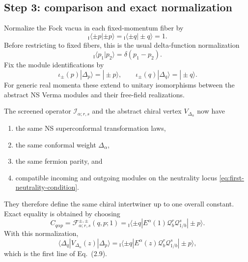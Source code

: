 \documentclass[11pt]{article}
\newcommand{\Ibra}[1]{{}_{\mathsf I}\!\langle #1|}
\begin{document}
\subsection{Step 3: comparison and exact normalization}

Normalize the Fock vacua in each fixed-momentum fiber by
\begin{equation}
 \Ibra{\pm p}\pm p\rangle
 =
 \Ibra{\pm q}\pm q\rangle
 =1.
 \label{eq:Fock-vacuum-normalization}
\end{equation}
Before restricting to fixed fibers, this is the usual delta-function
normalization
\begin{equation}
 \Ibra{p_1}p_2\rangle=\delta(p_1-p_2).
 \label{eq:delta-function-normalization}
\end{equation}
Fix the module identifications by
\begin{equation}
 \iota_\pm(p)|\Delta_p\rangle=|\pm p\rangle,
 \qquad
 \iota_\pm(q)|\Delta_q\rangle=|\pm q\rangle.
 \label{eq:normalized-module-identifications}
\end{equation}
For generic real momenta these extend to unitary isomorphisms between the
abstract NS Verma modules and their free-field realizations.

The screened operator \(\mathcal I_{\alpha;r,s}\) and the abstract chiral
vertex \(V_{\Delta_\alpha}\) now have
\begin{enumerate}
 \item the same NS superconformal transformation laws,
 \item the same conformal weight \(\Delta_\alpha\),
 \item the same fermion parity, and
 \item compatible incoming and outgoing modules on the neutrality locus
       \eqref{eq:first-neutrality-condition}.
\end{enumerate}
They therefore define the same chiral intertwiner up to one overall
constant.  Exact equality is obtained by choosing
\begin{equation}
 \boxed{
 C_{q\alpha p}
 =
 \mathcal F_{\alpha;r,s}^{\pm,\pm}(q,p;1)
 =
 \Ibra{\pm q}
 E^\alpha(1)\mathcal Q_b^r\mathcal Q_{1/b}^s
 |\pm p\rangle
 }.
 \label{eq:compatible-chiral-vertex-normalization}
\end{equation}
With this normalization,
\begin{equation}
 \boxed{
 \langle\Delta_q|
 V_{\Delta_\alpha}(z)
 |\Delta_p\rangle
 =
 \Ibra{\pm q}
 E^\alpha(z)\mathcal Q_b^r\mathcal Q_{1/b}^s
 |\pm p\rangle
 },
 \label{eq:first-form-of-2.9}
\end{equation}
which is the first line of Eq.~(2.9).
\end{document}

